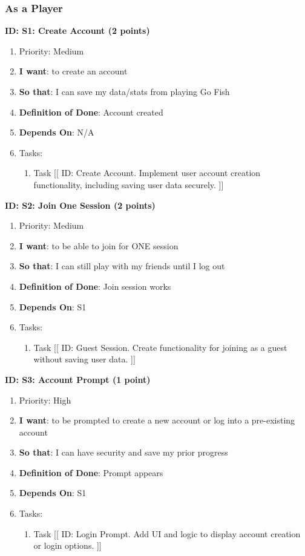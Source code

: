 \subsubsection{As a Player}

\textbf{ID: S1: Create Account (2 points)}
\begin{enumerate}
    \item Priority: Medium
    \item \textbf{I want}: to create an account
    \item \textbf{So that}: I can save my data/stats from playing Go Fish
    \item \textbf{Definition of Done}: Account created
    \item \textbf{Depends On}: N/A
    \item Tasks:
    \begin{enumerate}
        \item Task [[ ID: Create Account. Implement user account creation functionality, including saving user data securely. ]]
    \end{enumerate}
\end{enumerate}

\textbf{ID: S2: Join One Session (2 points)}
\begin{enumerate}
    \item Priority: Medium
    \item \textbf{I want}: to be able to join for ONE session
    \item \textbf{So that}: I can still play with my friends until I log out
    \item \textbf{Definition of Done}: Join session works
    \item \textbf{Depends On}: S1
    \item Tasks:
    \begin{enumerate}
        \item Task [[ ID: Guest Session. Create functionality for joining as a guest without saving user data. ]]
    \end{enumerate}
\end{enumerate}

\textbf{ID: S3: Account Prompt (1 point)}
\begin{enumerate}
    \item Priority: High
    \item \textbf{I want}: to be prompted to create a new account or log into a pre-existing account
    \item \textbf{So that}: I can have security and save my prior progress
    \item \textbf{Definition of Done}: Prompt appears
    \item \textbf{Depends On}: S1
    \item Tasks:
    \begin{enumerate}
        \item Task [[ ID: Login Prompt. Add UI and logic to display account creation or login options. ]]
    \end{enumerate}
\end{enumerate}

